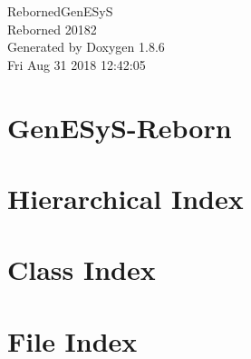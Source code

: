 \documentclass[twoside]{book}
\newcommand{\clearemptydoublepage}{%
  \newpage{\pagestyle{empty}\cleardoublepage}%
}
\begin{document}
\hypersetup{pageanchor=false}
\begin{titlepage}
\vspace*{7cm}
\begin{center}%
{\Large Reborned\-Gen\-E\-Sy\-S \\[1ex]\large Reborned 20182 }\\
\vspace*{1cm}
{\large Generated by Doxygen 1.8.6}\\
\vspace*{0.5cm}
{\small Fri Aug 31 2018 12:42:05}\\
\end{center}
\end{titlepage}
\clearemptydoublepage
\tableofcontents
\clearemptydoublepage
{}
\hypersetup{pageanchor=true}

\chapter{Gen\-E\-Sy\-S-\/\-Reborn}
\label{md__r_e_a_d_m_e}
\hypertarget{md__r_e_a_d_m_e}{}

\chapter{Hierarchical Index}

\chapter{Class Index}

\chapter{File Index}

\end{document}
